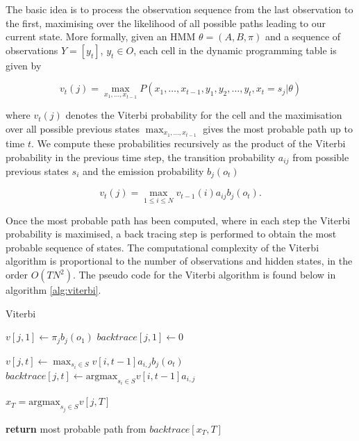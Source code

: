The basic idea is to process the observation sequence from the last observation to the first, maximising over the likelihood of all possible paths leading to our current state. More formally, given an \ac{HMM} $\theta = (A, B, \pi)$ and a sequence of observations $Y = [y_t]$, $y_t \in O$, each cell in the dynamic programming table is given by

\begin{equation}
    v_t(j) = \max_{x_1,\ldots,x_{t-1}} P(x_1,\ldots,x_{t-1}, y_1, y_2, \ldots, y_t, x_t = s_j | \theta)
\end{equation}

where $v_t(j)$ denotes the Viterbi probability for the cell and the maximisation over all possible previous states $\max_{x_1, \ldots, x_{t-1}}$ gives the most probable path up to time $t$. We compute these probabilities recursively as the product of the Viterbi probability in the previous time step, the transition probability $a_{ij}$ from possible previous states $s_i$ and the emission probability $b_j(o_t)$

\begin{equation}
    v_t(j) = \max_{1\leq i\leq N} v_{t-1}(i)a_{ij}b_j(o_t).
\end{equation}

Once the most probable path has been computed, where in each step the Viterbi probability is maximised, a back tracing step is performed to obtain the most probable sequence of states. The computational complexity of the Viterbi algorithm is proportional to the number of observations and hidden states, in the order $O(TN^2)$. The pseudo code for the Viterbi algorithm is found below in algorithm \ref{alg:viterbi}.

\begin{algorithm}[H]
    \caption{Viterbi}
    \label{alg:viterbi}
    \begin{algorithmic}
    
    
    \State $v[j,1] \gets \pi_j b_j(o_1)$
    \State $backtrace[j,1] \gets 0$ 
    \EndFor
    
        \State $v[j,t] \gets \max_{s_i \in S}v[i,t-1]a_{i,j}b_j(o_t)$ 
        \State $backtrace[j,t] \gets\text{argmax}_{s_i\in S} v[i, t-1]a_{i,j}$
    \EndFor
    \EndFor
    
    
    \State $x_T = \text{argmax}_{s_j \in S} v[j,T]$
    
\State \textbf{return} most probable path from $backtrace[x_T, T]$
\EndFunction
\end{algorithmic}
\end{algorithm}

